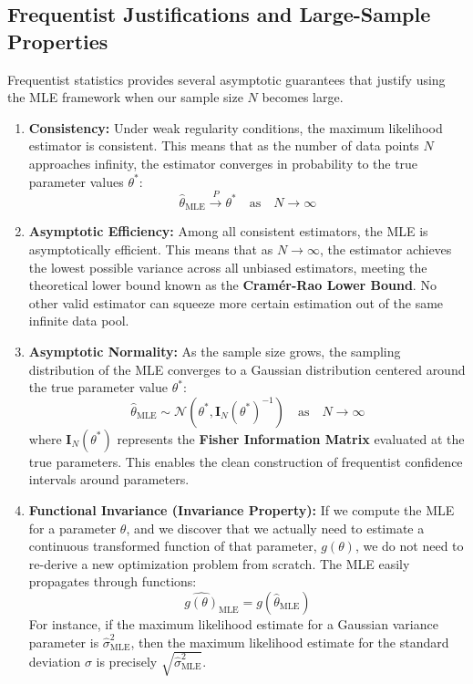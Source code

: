 \documentclass{article}
\begin{document}
\subsection{Frequentist Justifications and Large-Sample Properties}

Frequentist statistics provides several asymptotic guarantees that justify using the MLE framework when our sample size $N$ becomes large.

\begin{enumerate}
    \item \textbf{Consistency:} Under weak regularity conditions, the maximum likelihood estimator is consistent. This means that as the number of data points $N$ approaches infinity, the estimator converges in probability to the true parameter values $\theta^*$:
    \begin{equation}
    \hat{\theta}_{\text{MLE}} \xrightarrow{P} \theta^* \quad \text{as} \quad N \to \infty
    \end{equation}
    
    \item \textbf{Asymptotic Efficiency:} Among all consistent estimators, the MLE is asymptotically efficient. This means that as $N \to \infty$, the estimator achieves the lowest possible variance across all unbiased estimators, meeting the theoretical lower bound known as the \textbf{Cram\'{e}r-Rao Lower Bound}. No other valid estimator can squeeze more certain estimation out of the same infinite data pool.
    
    \item \textbf{Asymptotic Normality:} As the sample size grows, the sampling distribution of the MLE converges to a Gaussian distribution centered around the true parameter value $\theta^*$:
    \begin{equation}
    \hat{\theta}_{\text{MLE}} \sim \mathcal{N}\left(\theta^*, \mathbf{I}_N(\theta^*)^{-1}\right) \quad \text{as} \quad N \to \infty
    \end{equation}
    where $\mathbf{I}_N(\theta^*)$ represents the \textbf{Fisher Information Matrix} evaluated at the true parameters. This enables the clean construction of frequentist confidence intervals around parameters.
    
    \item \textbf{Functional Invariance (Invariance Property):} If we compute the MLE for a parameter $\theta$, and we discover that we actually need to estimate a continuous transformed function of that parameter, $g(\theta)$, we do not need to re-derive a new optimization problem from scratch. The MLE easily propagates through functions:
    \begin{equation}
    \widehat{g(\theta)}_{\text{MLE}} = g\left(\hat{\theta}_{\text{MLE}}\right)
    \end{equation}
    For instance, if the maximum likelihood estimate for a Gaussian variance parameter is $\hat{\sigma}^2_{\text{MLE}}$, then the maximum likelihood estimate for the standard deviation $\sigma$ is precisely $\sqrt{\hat{\sigma}^2_{\text{MLE}}}$.
\end{enumerate}
\end{document}
